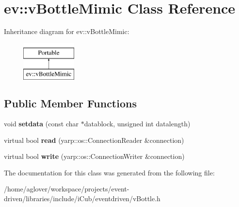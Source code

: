 \hypertarget{classev_1_1vBottleMimic}{}\section{ev\+:\+:v\+Bottle\+Mimic Class Reference}
\label{classev_1_1vBottleMimic}
Inheritance diagram for ev\+:\+:v\+Bottle\+Mimic\+:\begin{figure}[H]
\begin{center}
\leavevmode
\includegraphics[height=2.000000cm]{classev_1_1vBottleMimic}
\end{center}
\end{figure}
\subsection*{Public Member Functions}
\begin{DoxyCompactItemize}
\item 
void {\bfseries setdata} (const char $\ast$datablock, unsigned int datalength)\hypertarget{classev_1_1vBottleMimic_a03c64a63225e333a11b2693213f44165}{}\label{classev_1_1vBottleMimic_a03c64a63225e333a11b2693213f44165}

\item 
virtual bool {\bfseries read} (yarp\+::os\+::\+Connection\+Reader \&connection)\hypertarget{classev_1_1vBottleMimic_a5c7ead7b0484b9abe99e922196c074ff}{}\label{classev_1_1vBottleMimic_a5c7ead7b0484b9abe99e922196c074ff}

\item 
virtual bool {\bfseries write} (yarp\+::os\+::\+Connection\+Writer \&connection)\hypertarget{classev_1_1vBottleMimic_a39ad9b924890d8f8f717f49b6c5ad23f}{}\label{classev_1_1vBottleMimic_a39ad9b924890d8f8f717f49b6c5ad23f}

\end{DoxyCompactItemize}


The documentation for this class was generated from the following file\+:\begin{DoxyCompactItemize}
\item 
/home/aglover/workspace/projects/event-\/driven/libraries/include/i\+Cub/eventdriven/v\+Bottle.\+h\end{DoxyCompactItemize}
